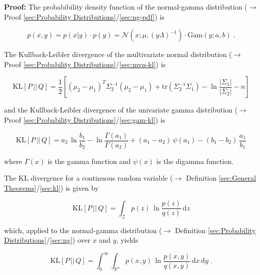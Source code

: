 \documentclass[a4paper,12pt,twoside]{book}
\begin{document}
\vspace{1em}
\textbf{Proof:} The probabibility density function of the normal-gamma distribution ($\rightarrow$ Proof \ref{sec:Probability Distributions}/\ref{sec:ng-pdf}) is

\begin{equation} \label{eq:ng-kl-NG-pdf}
p(x,y) = p(x|y) \cdot p(y) = \mathcal{N}(x; \mu, (y \Lambda)^{-1}) \cdot \mathrm{Gam}(y; a, b) \; .
\end{equation}

The Kullback-Leibler divergence of the multivariate normal distribution ($\rightarrow$ Proof \ref{sec:Probability Distributions}/\ref{sec:mvn-kl}) is

\begin{equation} \label{eq:ng-kl-mvn-KL}
\mathrm{KL}[P\,||\,Q] = \frac{1}{2} \left[ (\mu_2 - \mu_1)^T \Sigma_2^{-1} (\mu_2 - \mu_1) + \mathrm{tr}(\Sigma_2^{-1} \Sigma_1) - \ln \frac{|\Sigma_1|}{|\Sigma_2|} - n \right]
\end{equation}

and the Kullback-Leibler divergence of the univariate gamma distribution ($\rightarrow$ Proof \ref{sec:Probability Distributions}/\ref{sec:gam-kl}) is

\begin{equation} \label{eq:ng-kl-gam-KL}
\mathrm{KL}[P\,||\,Q] = a_2 \, \ln \frac{b_1}{b_2} - \ln \frac{\Gamma(a_1)}{\Gamma(a_2)} + (a_1 - a_2) \, \psi(a_1) - (b_1 - b_2) \, \frac{a_1}{b_1}
\end{equation}

where $\Gamma(x)$ is the gamma function and $\psi(x)$ is the digamma function.

\vspace{1em}
The KL divergence for a continuous random variable ($\rightarrow$ Definition \ref{sec:General Theorems}/\ref{sec:kl}) is given by 

\begin{equation} \label{eq:ng-kl-KL-cont}
\mathrm{KL}[P\,||\,Q] = \int_{\mathcal{Z}} p(z) \, \ln \frac{p(z)}{q(z)} \, \mathrm{d}z
\end{equation}

which, applied to the normal-gamma distribution ($\rightarrow$ Definition \ref{sec:Probability Distributions}/\ref{sec:ng}) over $x$ and $y$, yields

\begin{equation} \label{eq:ng-kl-NG-KL0}
\mathrm{KL}[P\,||\,Q] = \int_{0}^{\infty} \int_{\mathbb{R}^n} p(x,y) \, \ln \frac{p(x,y)}{q(x,y)} \, \mathrm{d}x \, \mathrm{d}y \; .
\end{equation}
\end{document}
